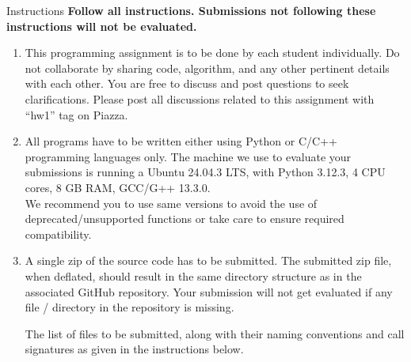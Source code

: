 \documentclass[10pt]{article}
\begin{document}
\begin{exbox}{Instructions}
\textbf{\large Follow all instructions. Submissions not following these instructions will not be evaluated.}
{\small
\begin{enumerate}
\item This programming assignment is to be done by each student individually. Do not collaborate by sharing code, algorithm, and any other pertinent details with each other. You are free to discuss and post questions to seek clarifications. Please post all discussions related to this assignment with ``hw1'' tag on Piazza. 
\item All programs have to be written either using Python or C/C++ programming languages only. The machine we use to evaluate your submissions is running a Ubuntu 24.04.3 LTS, with Python 3.12.3, 4 CPU cores, 8 GB RAM, GCC/G++ 13.3.0.  \\
We recommend you to use same versions to avoid the use of deprecated/unsupported functions or take care to ensure required compatibility. 
\item A single zip of the source code has to be submitted. The submitted zip file, when deflated, should result in the same directory structure as in the associated GitHub repository. Your submission will not get evaluated if any file / directory in the repository is missing.  
		
	
	The  list of files to be submitted, along with their naming conventions and call signatures as given in the instructions below.


\end{enumerate}}
\end{exbox}
\end{document}
